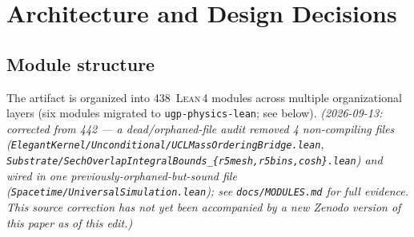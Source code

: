 \documentclass[11pt,a4paper]{article}
\theoremstyle{definition}
\newcommand{\lean}{\textsc{Lean}\,4}
\begin{document}
\section{Architecture and Design Decisions}\label{sec:arch}

\subsection{Module structure}

The artifact is organized into 438~\lean{} modules across multiple organizational layers
(six modules migrated to \texttt{ugp-physics-lean}; see below). \emph{(2026-09-13: corrected
from 442 — a dead/orphaned-file audit removed 4 non-compiling files
(\texttt{ElegantKernel/Unconditional/UCLMassOrderingBridge.lean},
\texttt{Substrate/SechOverlapIntegralBounds\_\{r5mesh,r5bins,cosh\}.lean}) and wired in
one previously-orphaned-but-sound file (\texttt{Spacetime/UniversalSimulation.lean});
see \texttt{docs/MODULES.md} for full evidence. This source correction has not yet been
accompanied by a new Zenodo version of this paper as of this edit.)}
\end{document}
